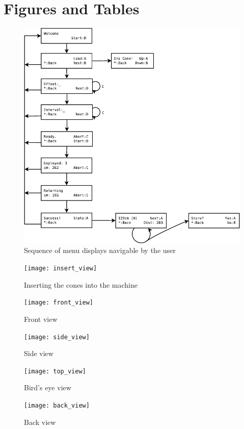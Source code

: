 \documentclass[11pt]{report}
\begin{document}
\newpage
\section{Figures and Tables}
\begin{figure}
  \centering
  \includegraphics[width=\textwidth]{menu_flowchart.pdf}
  \caption{Sequence of menu displays navigable by the user}
  \label{fig:menuflow}
\end{figure}
\begin{figure}
  \centering
  \texttt{[image: insert\_view]}
  \caption{Inserting the cones into the machine}
  \label{fig:menuflow}
\end{figure}
\begin{figure}
  \centering
  \texttt{[image: front\_view]}
  \caption{Front view}
  \label{fig:menuflow}
\end{figure}
\begin{figure}
  \centering
  \texttt{[image: side\_view]}
  \caption{Side view}
  \label{fig:menuflow}
\end{figure}
\begin{figure}
  \centering
  \texttt{[image: top\_view]}
  \caption{Bird's eye view}
  \label{fig:menuflow}
\end{figure}
\begin{figure}
  \centering
  \texttt{[image: back\_view]}
  \caption{Back view}
  \label{fig:menuflow}
\end{figure}
\newpage
\end{document}

